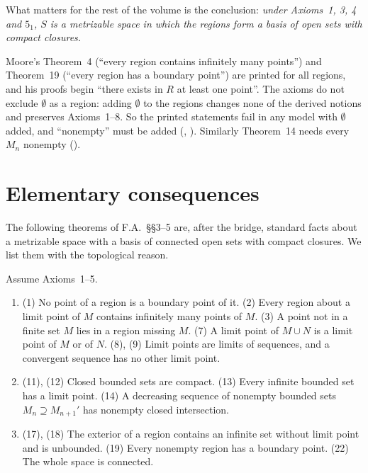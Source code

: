 What matters for the rest of the volume is the conclusion: \emph{under Axioms~1, 3, 4
and $5_1$, $S$ is a metrizable space in which the regions form a basis of open sets with compact
closures.}

\begin{remark}\label{rem:empty-region}
Moore's Theorem~4 (``every region contains infinitely many points'') and Theorem~19 (``every region has
a boundary point'') are printed for all regions, and his proofs begin ``there exists in $R$ at least one
point''. The axioms do not exclude $\emptyset$ as a region: adding $\emptyset$ to the regions changes none of
the derived notions and preserves Axioms~1--8. So the printed statements fail in any model with
$\emptyset$ added, and ``nonempty'' must be added (,
). Similarly Theorem~14 needs every $M_n$ nonempty
().
\end{remark}

\section{Elementary consequences}

The following theorems of F.A.\ \S\S3--5 are, after the bridge, standard facts about a metrizable space
with a basis of connected open sets with compact closures. We list them with the topological reason.

\begin{theorem}[F.A.\ Theorems~1--3, 5, 7--9, 11--14, 17--19, 22]\label{thm:fa-elementary}
Assume Axioms~1--5.
\begin{enumerate}[label=(\alph*)]
\item (1) No point of a region is a boundary point of it. (2) Every region about a limit point of $M$
contains infinitely many points of $M$. (3) A point not in a finite set $M$ lies in a region missing
$M$. (7) A limit point of $M\cup N$ is a limit point of $M$ or of $N$. (8), (9) Limit points are limits
of sequences, and a convergent sequence has no other limit point.
\item (11), (12) Closed bounded sets are compact. (13) Every infinite bounded set has a limit point.
(14) A decreasing sequence of nonempty bounded sets $M_n\supseteq M_{n+1}'$ has nonempty closed
intersection.
\item (17), (18) The exterior of a region contains an infinite set without limit point and is unbounded.
(19) Every nonempty region has a boundary point. (22) The whole space is connected.
\end{enumerate}
\end{theorem}


